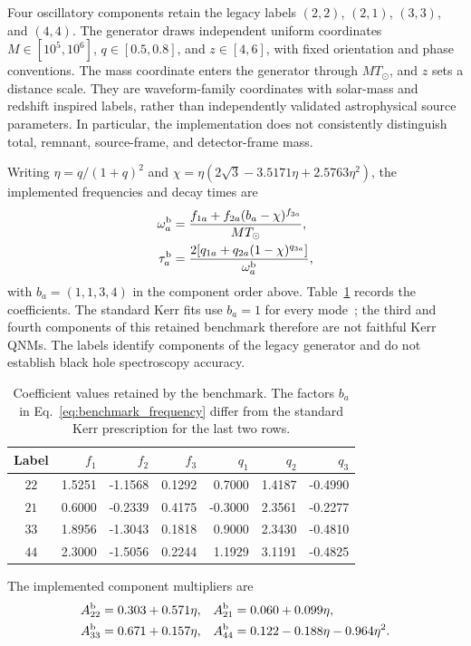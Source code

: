 \documentclass[10pt,prd,aps,a4paper,twocolumn,superscriptaddress,nofootinbib,floatfix]{revtex4-2}
\begin{document}
Four oscillatory components retain the legacy labels $(2,2)$, $(2,1)$, $(3,3)$, and $(4,4)$. The generator draws independent uniform coordinates $M\in[10^5,10^6]$, $q\in[0.5,0.8]$, and $z\in[4,6]$, with fixed orientation and phase conventions. The mass coordinate enters the generator through $M T_\odot$, and $z$ sets a distance scale. They are waveform-family coordinates with solar-mass and redshift inspired labels, rather than independently validated astrophysical source parameters. In particular, the implementation does not consistently distinguish total, remnant, source-frame, and detector-frame mass.

Writing $\eta=q/(1+q)^2$ and $\chi=\eta(2\sqrt{3}-3.5171\eta+2.5763\eta^2)$, the implemented frequencies and decay times are
\begin{align}
\omega_a^{\rm b}&=\frac{f_{1a}+f_{2a}(b_a-\chi)^{f_{3a}}}{M T_\odot},\label{eq:benchmark_frequency}\\
\tau_a^{\rm b}&=\frac{2[q_{1a}+q_{2a}(1-\chi)^{q_{3a}}]}{\omega_a^{\rm b}},
\end{align}
with $b_a=(1,1,3,4)$ in the component order above. Table~\ref{tab:frequency_coefficients} records the coefficients. The standard Kerr fits use $b_a=1$ for every mode~\cite{berti2006gravitational}; the third and fourth components of this retained benchmark therefore are not faithful Kerr QNMs. The labels identify components of the legacy generator and do not establish black hole spectroscopy accuracy.
\begin{table}[t]
\caption{Coefficient values retained by the benchmark. The factors $b_a$ in Eq.~\eqref{eq:benchmark_frequency} differ from the standard Kerr prescription for the last two rows.}\label{tab:frequency_coefficients}
\centering\begin{tabular}{crrrrrr}\hline\hline
Label & $f_1$ & $f_2$ & $f_3$ & $q_1$ & $q_2$ & $q_3$\\\hline
$22$ &1.5251&-1.1568&0.1292&0.7000&1.4187&-0.4990\\
$21$ &0.6000&-0.2339&0.4175&-0.3000&2.3561&-0.2277\\
$33$ &1.8956&-1.3043&0.1818&0.9000&2.3430&-0.4810\\
$44$ &2.3000&-1.5056&0.2244&1.1929&3.1191&-0.4825\\\hline\hline
\end{tabular}\end{table}
The implemented component multipliers are
\begin{align}
A_{22}^{\rm b}&=0.303+0.571\eta,& A_{21}^{\rm b}&=0.060+0.099\eta,\nonumber\\
A_{33}^{\rm b}&=0.671+0.157\eta,& A_{44}^{\rm b}&=0.122-0.188\eta-0.964\eta^2.
\end{align}
\end{document}
